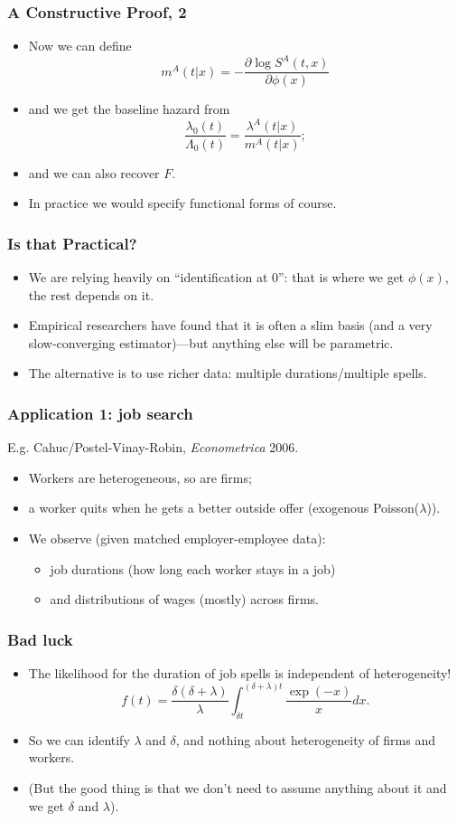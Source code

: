 \documentclass[aspectratio=169]{beamer}
\begin{document}
\begin{frame}
\frametitle{A Constructive Proof, 2}
\begin{itemize}
\item Now we can define
\[
m^A(t \vert x)=-\frac{\partial \log S^A(t,x)}{\partial \phi(x)}
\]
\item and we get the baseline hazard from 
\[
\frac{\lambda_0(t)}{\Lambda_0(t)}=\frac{\lambda^A(t \vert x)}{m^A(t \vert x)};
\]
\item  and we can also recover $F$. 
\item In practice we would specify functional forms of course.
\end{itemize}
\end{frame}


\begin{frame}
\frametitle{Is that Practical?}
\begin{itemize}
\item We are relying heavily on ``identification at 0'': that is where we
get $\phi(x)$, the rest depends on it.
\item Empirical researchers have found that it is often a slim basis (and a
very slow-converging estimator)---but
anything else will be parametric.
\item The alternative is to use richer data: multiple durations/multiple spells. 
\end{itemize}
\end{frame}

\begin{frame}
\frametitle{Application 1: job search}
E.g. Cahuc/Postel-Vinay-Robin, {\em Econometrica \/} 2006.
\begin{itemize}
\item Workers are heterogeneous, so are firms; 
\item a worker quits when he gets a better outside offer (exogenous Poisson($\lambda$)).
\item We observe (given matched employer-employee data): 
\begin{itemize}
\item job durations (how long each worker stays in a job)
\item and distributions of wages (mostly) across firms.
\end{itemize}
\end{itemize}
\end{frame}


\begin{frame}
\frametitle{Bad luck}
\begin{itemize}
\item The likelihood for the duration of job spells is independent of heterogeneity!
\[
f(t)=\frac{\delta(\delta+\lambda)}{\lambda}\int_{\delta t}^{(\delta+\lambda)t} \frac{\exp(-x)}{x} dx.
\]
\item So we can identify $\lambda$ and $\delta$, and nothing about heterogeneity of firms and workers.
\item (But the good thing is that we don't need to assume anything about it and we get $\delta$ and $\lambda$).
\end{itemize}
\end{frame}
\end{document}
